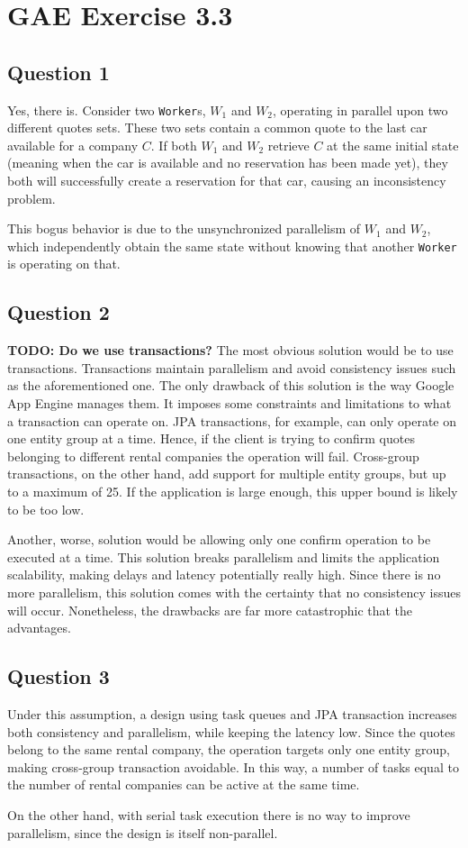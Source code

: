 \section{GAE Exercise 3.3}
\subsection{Question 1}
Yes, there is. Consider two \texttt{Worker}s, $W_1$ and $W_2$, operating in parallel upon two different quotes sets. These two sets contain a common quote to the last car available for a company $C$. If both $W_1$ and $W_2$ retrieve $C$ at the same initial state (meaning when the car is available and no reservation has been made yet), they both will successfully create a reservation for that car, causing an inconsistency problem. 

This bogus behavior is due to the unsynchronized parallelism of $W_1$ and $W_2$, which independently obtain the same state without knowing that another \texttt{Worker} is operating on that.

\subsection{Question 2}
\textbf{TODO: Do we use transactions?}
The most obvious solution would be to use transactions. Transactions maintain parallelism and avoid consistency issues such as the aforementioned one. The only drawback of this solution is the way Google App Engine manages them. It imposes some constraints and limitations to what a transaction can operate on. JPA transactions, for example, can only operate on one entity group at a time. Hence, if the client is trying to confirm quotes belonging to different rental companies the operation will fail. Cross-group transactions, on the other hand, add support for multiple entity groups, but up to a maximum of 25. If the application is large enough, this upper bound is likely to be too low.

Another, worse, solution would be allowing only one confirm operation to be executed at a time. This solution breaks parallelism and limits the application scalability, making delays and latency potentially really high. Since there is no more parallelism, this solution comes with the certainty that no consistency issues will occur. Nonetheless, the drawbacks are far more catastrophic that the advantages. 

\subsection{Question 3}
Under this assumption, a design using task queues and JPA transaction increases both consistency and parallelism, while keeping the latency low. Since the quotes belong to the same rental company, the operation targets only one entity group, making cross-group transaction avoidable. In this way, a number of tasks equal to the number of rental companies can be active at the same time.

On the other hand, with serial task execution there is no way to improve parallelism, since the design is itself non-parallel. 

